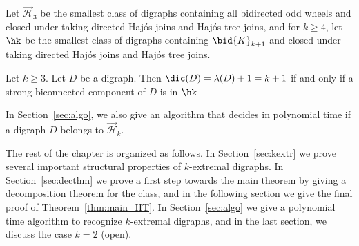 



\begin{definition}   
Let $\vec{\mathcal H}_3$ be the smallest class of digraphs containing all bidirected odd wheels and closed under taking directed Haj\'os joins and Haj\'os tree joins, and for $k \geq 4$, let  $\hk$ be the smallest class of digraphs containing $\bid{K}_{k+1}$ and closed under taking directed Haj\'os joins and Haj\'os tree joins.
\end{definition}

\begin{theorem}\label{thm:main_HT}
    Let $k\geq 3$. Let $D$ be a digraph. Then $\dic(D) = \lambda(D) + 1=k+1$ if and only if a strong biconnected component of $D$ is in $\hk$
\end{theorem}


In Section~\ref{sec:algo}, we also give an algorithm that decides in polynomial time if a digraph $D$ belongs to $\vec {\mathcal H}_k$. 

The rest of the chapter is organized as follows. In Section~\ref{sec:kextr} we prove several important structural properties of $k$-extremal digraphs. In Section~\ref{sec:decthm} we prove a first step towards the main theorem by giving a decomposition theorem for the class, and in the following section we give the final proof of Theorem~\ref{thm:main_HT}. In Section~\ref{sec:algo} we give a polynomial time algorithm to recognize $k$-extremal digraphs, and in the last section, we discuss the case $k=2$ (open).






